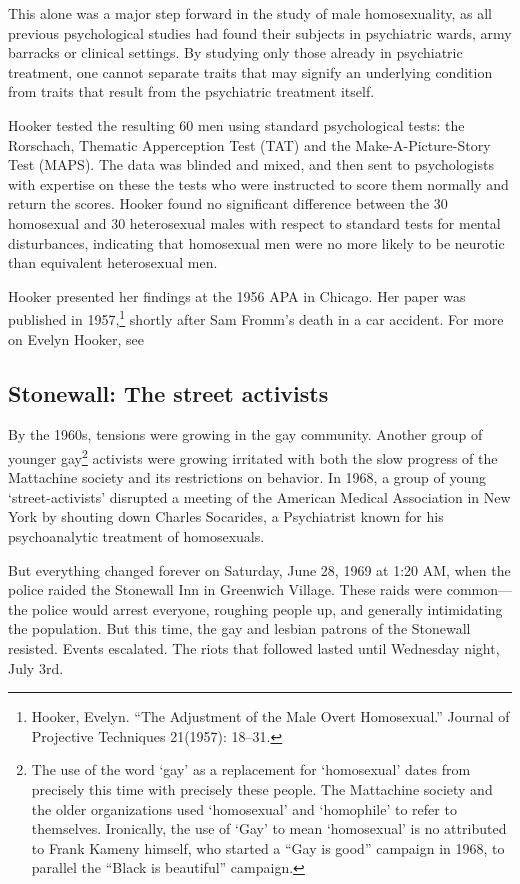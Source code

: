 \begin{refsection}
This alone was a major step forward in the study of male homosexuality, as all previous psychological studies had found their subjects in psychiatric wards, army barracks or clinical settings. By studying only those already in psychiatric treatment, one cannot separate traits that may signify an underlying condition from traits that result from the psychiatric treatment itself.

Hooker tested the resulting 60 men using standard psychological tests: the Rorschach, Thematic Apperception Test (TAT) and the Make-A-Picture-Story Test (MAPS). The data was blinded and mixed, and then sent to psychologists with expertise on these the tests who were instructed to score them normally and return the scores. Hooker found no significant difference between the 30 homosexual and 30 heterosexual males with respect to standard tests for mental disturbances, indicating that homosexual men were no more likely to be neurotic than equivalent heterosexual men.

Hooker presented her findings at the 1956 APA in Chicago. Her paper was published in 1957,\footnote{Hooker, Evelyn. ``The Adjustment of the Male Overt Homosexual.'' Journal of Projective Techniques 21(1957): 18--31.} shortly after Sam Fromm's death in a car accident. For more on Evelyn Hooker, see ~\citep{Aldrich:2005wq}

\subsection{Stonewall: The street activists}
\label{stonewall:thestreetactivists}

By the 1960s, tensions were growing in the gay community. Another group of younger gay\footnote{The use of the word `gay' as a replacement for `homosexual' dates from precisely this time with precisely these people. The Mattachine society and the older organizations used `homosexual' and `homophile' to refer to themselves. Ironically, the use of `Gay' to mean `homosexual' is no attributed to Frank Kameny himself, who started a ``Gay is good'' campaign in 1968, to parallel the ``Black is beautiful'' campaign.} activists were growing irritated with both the slow progress of the Mattachine society and its restrictions on behavior. In 1968, a group of young `street-activists' disrupted a meeting of the American Medical Association in New York by shouting down Charles Socarides, a Psychiatrist known for his psychoanalytic treatment of homosexuals.

But everything changed forever on Saturday, June 28, 1969 at 1:20 AM, when the police raided the Stonewall Inn in Greenwich Village. These raids were common---the police would arrest everyone, roughing people up, and generally intimidating the population. But this time, the gay and lesbian patrons of the Stonewall resisted. Events escalated. The riots that followed lasted until Wednesday night, July 3rd. 
\begin{marginfigure}
 \begin{center}


\end{center}
\end{marginfigure}
\end{refsection}
